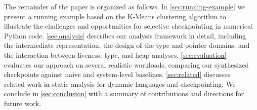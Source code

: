 The remainder of the paper is organized as follows. In \autoref{sec:running-example} we present a running example based on the K-Means clustering algorithm to illustrate the challenges and opportunities for selective checkpointing in numerical Python code. \autoref{sec:analysis} describes our analysis framework in detail, including the intermediate representation, the design of the type and pointer domains, and the interaction between liveness, type, and heap analyses. \autoref{sec:evaluation} evaluates our approach on several realistic workloads, comparing our synthesized checkpoints against naive and system-level baselines. \autoref{sec:related} discusses related work in static analysis for dynamic languages and checkpointing. We conclude in \autoref{sec:conclusion} with a summary of contributions and directions for future work.
